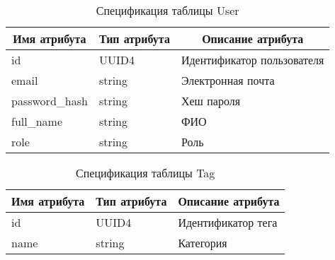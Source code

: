 \begin{table}[H]
	\caption{Спецификация таблицы User}
	\begin{tabular}{|l|l|l|}
		\hline
		\multicolumn{1}{|c|}{\textbf{Имя атрибута}} & \multicolumn{1}{c|}{\textbf{Тип атрибута}} & \multicolumn{1}{c|}{\textbf{Описание атрибута}} \\ \hline
		id                                          & UUID4                                      & Идентификатор пользователя                      \\ \hline
		email                                       & string                                     & Электронная почта                               \\ \hline
		password\_hash                              & string                                     & Хеш пароля                                      \\ \hline
		full\_name                                  & string                                     & ФИО                                             \\ \hline
		role                                        & string                                     & Роль \\ \hline
	\end{tabular}
\end{table}

\begin{table}[H]
	\caption{Спецификация таблицы Tag}
	\begin{tabular}{|l|l|l|}
		\hline
		\multicolumn{1}{|c|}{\textbf{Имя атрибута}} & \multicolumn{1}{c|}{\textbf{Тип атрибута}} & \multicolumn{1}{c|}{\textbf{Описание атрибута}} \\ \hline
		id                                          & UUID4                                      & Идентификатор тега                              \\ \hline
		name                                        & string                                     & Категория                                       \\ \hline
	\end{tabular}
\end{table}

